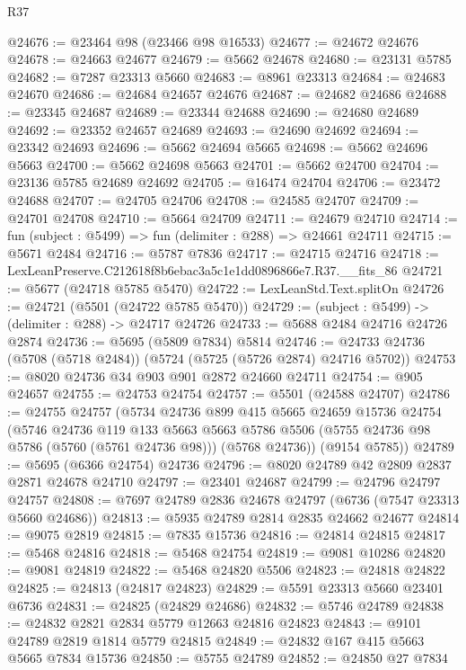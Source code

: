 \begin{lexlean}{R37}
\begin{coremodule}
@24676 := @23464 @98 (@23466 @98 @16533)
@24677 := @24672 @24676
@24678 := @24663 @24677
@24679 := @5662 @24678
@24680 := @23131 @5785
@24682 := @7287 @23313 @5660
@24683 := @8961 @23313
@24684 := @24683 @24670
@24686 := @24684 @24657 @24676
@24687 := @24682 @24686
@24688 := @23345 @24687
@24689 := @23344 @24688
@24690 := @24680 @24689
@24692 := @23352 @24657 @24689
@24693 := @24690 @24692
@24694 := @23342 @24693
@24696 := @5662 @24694 @5665
@24698 := @5662 @24696 @5663
@24700 := @5662 @24698 @5663
@24701 := @5662 @24700
@24704 := @23136 @5785 @24689 @24692
@24705 := @16474 @24704
@24706 := @23472 @24688
@24707 := @24705 @24706
@24708 := @24585 @24707
@24709 := @24701 @24708
@24710 := @5664 @24709
@24711 := @24679 @24710
@24714 := fun (subject : @5499) => fun (delimiter : @288) => @24661 @24711
@24715 := @5671 @2484
@24716 := @5787 @7836
@24717 := @24715 @24716
@24718 := LexLeanPreserve.C212618f8b6ebac3a5c1e1dd0896866e7.R37.__fits_86
@24721 := @5677 (@24718 @5785 @5470)
@24722 := LexLeanStd.Text.splitOn
@24726 := @24721 (@5501 (@24722 @5785 @5470))
@24729 := (subject : @5499) -> (delimiter : @288) -> @24717 @24726
@24733 := @5688 @2484 @24716 @24726 @2874
@24736 := @5695 (@5809 @7834) @5814
@24746 := @24733 @24736 (@5708 (@5718 @2484)) (@5724 (@5725 (@5726 @2874) @24716 @5702))
@24753 := @8020 @24736 @34 @903 @901 @2872 @24660 @24711
@24754 := @905 @24657
@24755 := @24753 @24754
@24757 := @5501 (@24588 @24707)
@24786 := @24755
    @24757
    (@5734
      @24736
      @899
      @415
      @5665
      @24659
      @15736
      @24754
      (@5746
        @24736
        @119
        @133
        @5663
        @5663
        @5786
        @5506
        (@5755 @24736 @98 @5786 (@5760 (@5761 @24736 @98)))
        (@5768 @24736))
      (@9154 @5785))
@24789 := @5695 (@6366 @24754) @24736
@24796 := @8020 @24789 @42 @2809 @2837 @2871 @24678 @24710
@24797 := @23401 @24687
@24799 := @24796 @24797 @24757
@24808 := @7697 @24789 @2836 @24678 @24797 (@6736 (@7547 @23313 @5660 @24686))
@24813 := @5935 @24789 @2814 @2835 @24662 @24677
@24814 := @9075 @2819
@24815 := @7835 @15736
@24816 := @24814 @24815
@24817 := @5468 @24816
@24818 := @5468 @24754
@24819 := @9081 @10286
@24820 := @9081 @24819
@24822 := @5468 @24820 @5506
@24823 := @24818 @24822
@24825 := @24813 (@24817 @24823)
@24829 := @5591 @23313 @5660 @23401 @6736
@24831 := @24825 (@24829 @24686)
@24832 := @5746 @24789
@24838 := @24832 @2821 @2834 @5779 @12663 @24816 @24823
@24843 := @9101 @24789 @2819 @1814 @5779 @24815
@24849 := @24832 @167 @415 @5663 @5665 @7834 @15736
@24850 := @5755 @24789
@24852 := @24850 @27 @7834

\end{coremodule}
\end{lexlean}
